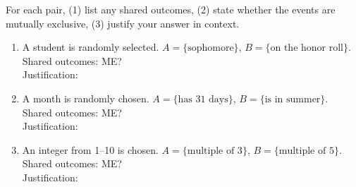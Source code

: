 \documentclass[10pt]{article}
\begin{document}
\vspace{0.1in}

\begin{practicebox}
\small For each pair, (1) list any shared outcomes, (2) state whether the events are
mutually exclusive, (3) justify your answer in context.

\vspace{6pt}
\begin{enumerate}[leftmargin=1.5em, itemsep=10pt]
  \item A student is randomly selected. $A = \{\text{sophomore}\}$, $B = \{\text{on the honor roll}\}$.\\
        Shared outcomes:  \quad ME? \\
        Justification: 

  \item A month is randomly chosen. $A = \{\text{has 31 days}\}$, $B = \{\text{is in summer}\}$.\\
        Shared outcomes:  \quad ME? \\
        Justification: 

  \item An integer from 1--10 is chosen. $A = \{\text{multiple of 3}\}$, $B = \{\text{multiple of 5}\}$.\\
        Shared outcomes:  \quad ME? \\
        Justification: 
\end{enumerate}
\end{practicebox}
\end{document}

